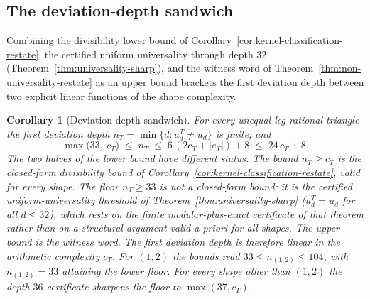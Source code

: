 \documentclass[11pt]{article}
\theoremstyle{plain}
\newtheorem{corollary}[theorem]{Corollary}
\theoremstyle{definition}
\theoremstyle{remark}
\begin{document}
\subsection{The deviation-depth sandwich}

Combining the divisibility lower bound of
Corollary~\ref{cor:kernel-classification-restate}, the certified uniform
universality through depth $32$ (Theorem~\ref{thm:universality-sharp}), and
the witness word of Theorem~\ref{thm:non-universality-restate} as an
upper bound brackets the first deviation depth between two explicit
linear functions of the shape complexity.

\begin{corollary}[Deviation-depth sandwich]
\label{cor:sandwich-restate}
For every unequal-leg rational triangle the first deviation depth
$n_T = \min\{d : u_d^T \neq u_d\}$ is finite, and
\[
\max\bigl(33,\ c_T\bigr) \;\le\; n_T \;\le\;
6\,(2c_T + |e_T|) + 8 \;\le\; 24\,c_T + 8 .
\]
The two halves of the lower bound have different status. The bound
$n_T \ge c_T$ is the closed-form divisibility bound of
Corollary~\ref{cor:kernel-classification-restate}, valid for every shape.
The floor $n_T \ge 33$ is not a closed-form bound: it is the certified
uniform-universality threshold of Theorem~\ref{thm:universality-sharp}
($u_d^T = u_d$ for all $d \le 32$), which rests on the finite
modular-plus-exact certificate of that theorem rather than on a structural
argument valid a priori for all shapes. The upper bound is the witness
word. The first deviation depth is therefore linear in the arithmetic
complexity $c_T$. For $(1,2)$ the bounds read
$33 \le n_{(1,2)} \le 104$, with $n_{(1,2)} = 33$ attaining the lower
floor. For every shape other than $(1,2)$ the depth-$36$ certificate sharpens the floor
to $\max(37, c_T)$.
\end{corollary}
\end{document}
